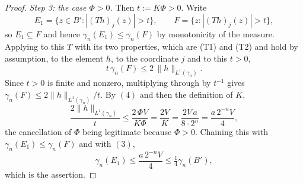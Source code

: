 \begin{proof}
\emph{Step 3: the case $\Phi > 0$.}  Then $t := K\Phi > 0$.  Write
\[
  E_1 = \{z \in B' : |(Th)_j(z)| > t\}, \qquad
  F = \{z : |(Th)_j(z)| > t\} ,
\]
so $E_1 \subseteq F$ and hence $\gamma_n(E_1) \leq \gamma_n(F)$ by
monotonicity of the measure.  Applying  to
this $T$ with its two properties, which are (T1) and (T2) and hold by
assumption, to the element $h$, to the coordinate $j$ and to this $t > 0$,
\[
  t\,\gamma_n(F) \leq 2\,\|h\|_{L^1(\gamma_n)} .
\]
Since $t > 0$ is finite and nonzero, multiplying through by $t^{-1}$ gives
$\gamma_n(F) \leq 2\|h\|_{L^1(\gamma_n)}/t$.  By $(4)$ and then the definition
of $K$,
\[
  \frac{2\|h\|_{L^1(\gamma_n)}}{t}
    \leq \frac{2\,\Phi V}{K\Phi}
    = \frac{2V}{K}
    = \frac{2V\,a}{8\cdot2^n}
    = \frac{a\,2^{-n}V}{4} ,
\]
the cancellation of $\Phi$ being legitimate because $\Phi > 0$.  Chaining this
with $\gamma_n(E_1) \leq \gamma_n(F)$ and with $(3)$,
\[
  \gamma_n(E_1) \leq \frac{a\,2^{-n}V}{4} \leq \tfrac14\gamma_n(B') ,
\]
which is the assertion.
\end{proof}
